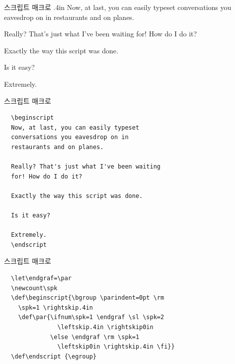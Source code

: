 \documentclass{beamer}
\begin{document}
%


%
\newcount\spk
\def\beginscript{\bgroup \parindent=0pt \rm \spk=1 \rightskip.4in
  \def\par{\ifnum\spk=1 \endgraf \sl \spk=2 \leftskip.4in \rightskip0in
    \else \endgraf \rm \spk=1 \leftskip0in \rightskip.4in \fi}}
\def\endscript {\egroup}

\begin{frame}[fragile]{스크립트 매크로}
  \hsize 3in
  \beginscript
  Now, at last, you can easily typeset
  conversations you eavesdrop on in
  restaurants and on planes.
  
  Really? That's just what I've been waiting
  for! How do I do it?
  
  Exactly the way this script was done.
  
  Is it easy?
  
  Extremely.
  \endscript
\end{frame}


%
\begin{frame}[fragile]{스크립트 매크로}
  \begin{verbatim}
  \beginscript
  Now, at last, you can easily typeset
  conversations you eavesdrop on in
  restaurants and on planes.
  
  Really? That's just what I've been waiting
  for! How do I do it?
  
  Exactly the way this script was done.
  
  Is it easy?
  
  Extremely.
  \endscript
  \end{verbatim}
\end{frame}


%
\begin{frame}[fragile]{스크립트 매크로}
  \begin{verbatim}
  \let\endgraf=\par
  \newcount\spk
  \def\beginscript{\bgroup \parindent=0pt \rm
    \spk=1 \rightskip.4in
    \def\par{\ifnum\spk=1 \endgraf \sl \spk=2
               \leftskip.4in \rightskip0in
             \else \endgraf \rm \spk=1
               \leftskip0in \rightskip.4in \fi}}
  \def\endscript {\egroup}
  \end{verbatim}
\end{frame}
\end{document}
